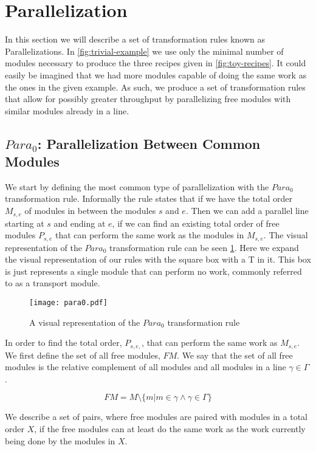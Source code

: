 \section{Parallelization}
In this section we will describe a set of transformation rules known as Parallelizations. In \cref{fig:trivial-example} we use only the minimal number of modules necessary to produce the three recipes given in \cref{fig:toy-recipes}. It could easily be imagined that we had more modules capable of doing the same work as the ones in the given example. As such, we produce a set of transformation rules that allow for possibly greater throughput by parallelizing free modules with similar modules already in a line.


\subsection{$Para_0$: Parallelization Between Common Modules}
We start by defining the most common type of parallelization with the $Para_0$ transformation rule. Informally the rule states that if we have the total order $M_{s,e}$ of modules in between the modules $s$ and $e$. Then we can add a parallel line starting at $s$ and ending at $e$, if we can find an existing total order of free modules $P_{s,e}$ that can perform the same work as the modules in $M_{s,e}$. The visual representation of the $Para_0$ transformation rule can be seen \cref{fig:para0}. Here we expand the visual representation of our rules with the square box with a T in it. This box is just represents a single module that can perform no work, commonly referred to as a transport module.

\begin{figure}[H]
	\centering
	\texttt{[image: para0.pdf]}
	\caption{A visual representation of the $Para_0$ transformation rule}
	\label{fig:para0}
\end{figure}

In order to find the total order, $P_{s,e,}$, that can perform the same work as $M_{s,e}$. We first define the set of all free modules, $FM$. We say that the set of all free modules is the relative complement of all modules and all modules in a line $\gamma \in \Gamma$.

\[FM = M \setminus \{m | m \in \gamma \land \gamma \in \Gamma\}\]

We describe a set of pairs, where free modules are paired with modules in a total order $X$, if the free modules can at least do the same work as the work currently being done by the modules in $X$.

